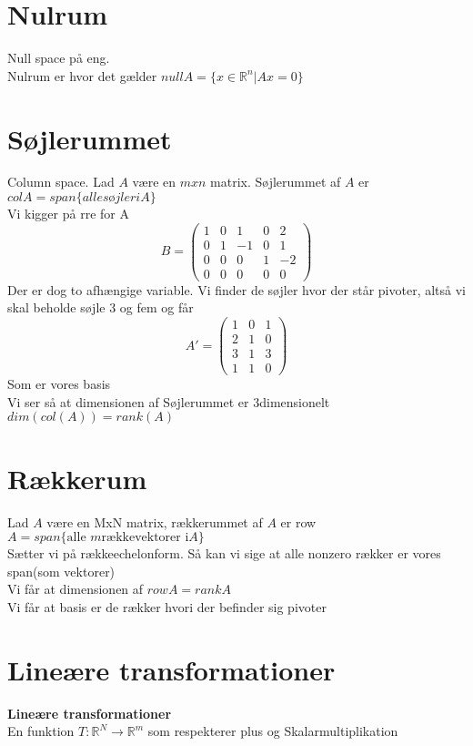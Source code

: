 \documentclass[a4paper,fleqn]{report}
\newcommand{\RR}{\mathbb{R}}
\begin{document}
	\section{Nulrum}
	Null space på eng.\\
	Nulrum er hvor det gælder $null A = \{ x \in \RR^n | Ax = 0 \}$

	\section{Søjlerummet}
	Column space. Lad $A$ være en $mxn$ matrix. Søjlerummet af $A$ er $col A = span \{ alle
	søjler i A\}$\\
	Vi kigger på rre for A\[ B = 
	\left(\begin{array}{rrrrr}
	1 & 0 & 1 & 0 & 2 \\
	0 & 1 & -1 & 0 & 1 \\
	0 & 0 & 0 & 1 & -2 \\
	0 & 0 & 0 & 0 & 0
	\end{array}\right) \] Der er dog to afhængige variable. Vi finder de søjler hvor der står
	pivoter, altså vi skal beholde søjle 3 og fem og får
	\[ A' = 
	\left(\begin{array}{rrrrr}
		1 & 0 &  1  \\
		2 & 1 &  0  \\
		3 & 1 &  3  \\
		1 & 1 &  0 
	\end{array}\right)
	\]
	Som er vores basis\\
	Vi ser så at dimensionen af Søjlerummet er 3dimensionelt $dim(col(A)) = rank(A)$\\

	\section{Rækkerum}
	Lad $A$ være en MxN matrix, rækkerummet af $A$ er row $A = span \{ \text{alle }m \text{
	rækkevektorer i} A\}$\\

	Sætter vi på rækkeechelonform. Så kan vi sige at alle nonzero rækker er vores span(som
	vektorer)\\
	Vi får at dimensionen af $row A = rank A$\\
	Vi får at basis er de rækker hvori der befinder sig pivoter

	
	\section{Lineære transformationer}
	\textbf{Lineære transformationer}\\
	En funktion $T: \RR^N \rightarrow \RR^m$ som respekterer plus og Skalarmultiplikation\\
\end{document}
